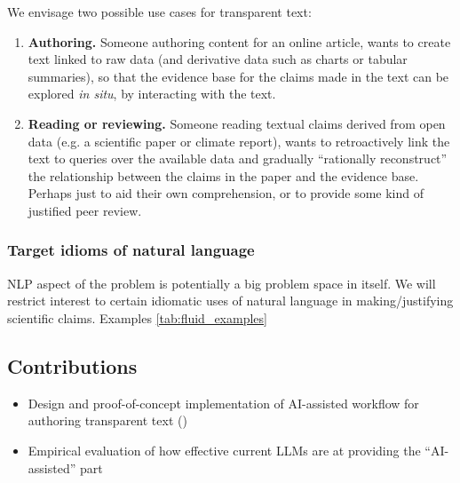 We envisage two possible use cases for transparent text:

\begin{enumerate}
\item \textbf{Authoring.} Someone authoring content for an online article, wants to create text
linked to raw data (and derivative data such as charts or tabular summaries), so that the evidence base for
the claims made in the text can be explored \emph{in situ}, by interacting with the text.

\item \textbf{Reading or reviewing.} Someone reading textual claims derived from open data (e.g. a
scientific paper or climate report), wants to retroactively link the text to queries over the available data
and gradually ``rationally reconstruct'' the relationship between the claims in the paper and the evidence
base. Perhaps just to aid their own comprehension, or to provide some kind of justified peer review.
\end{enumerate}



\subsubsection{Target idioms of natural language}

NLP aspect of the problem is potentially a big problem space in itself. We will restrict interest to certain
idiomatic uses of natural language in making/justifying scientific claims.
Examples \ref{tab:fluid_examples}



\subsection{Contributions}

\begin{itemize}
    \item Design and proof-of-concept implementation of AI-assisted workflow for authoring transparent text
    ()
    \item Empirical evaluation of how effective current LLMs are at providing the ``AI-assisted'' part
\end{itemize}
